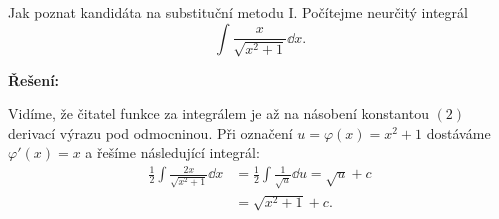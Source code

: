 \begin{mdframed}[style=mdexam]
  \begin{example}\label{MAI:exam110}
    Jak poznat kandidáta na substituční metodu I. Počítejme neurčitý integrál 
    \begin{equation*}
      \int\frac{x}{\sqrt{x^2+1}}\dd{x}.
    \end{equation*} 

    \noindent\textbf{Řešení:}

    Vidíme, že čitatel funkce za integrálem je až na násobení konstantou \((2)\) derivací výrazu pod
    odmocninou. Při označení \(u=\varphi(x) = x^2 + 1\) dostáváme \(\varphi'(x) = x\) a řešíme
    následující integrál:
    \begin{align*}
      \frac{1}{2}\int\frac{2x}{\sqrt{x^2+1}}\dd{x} 
        &= \frac{1}{2}\int\frac{1}{\sqrt{u}}\dd{u} = \sqrt{u} + c \\    
        &= \sqrt{x^2 + 1} + c.  
    \end{align*}
  \end{example}
\end{mdframed}